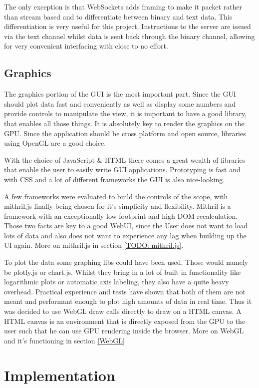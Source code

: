 The only exception is that WebSockets adds framing to make it packet rather than stream based and to differentiate between binary and text data.
This differentiation is very useful for this project. Instructions to the server are issued via the text channel whilst data is sent back through the binary channel, allowing for very convenient interfacing with close to no effort.

\subsection{Graphics}

The graphics portion of the GUI is the most important part. Since the GUI should plot data fast and conveniently as well as display some numbers and provide controls to manipulate the view, it is important to have a good library, that enables all those things. It is absolutely key to render the graphics on the GPU. Since the application should be cross platform and open source, libraries using OpenGL are a good choice.

With the choice of JavaScript \& HTML there comes a great wealth of libraries that enable the user to easily write GUI applications. Prototyping is fast and with CSS and a lot of different frameworks the GUI is also nice-looking.

A few frameworks were evaluated to build the controls of the scope, with mithril.js finally being chosen for it's simplicity and flexibility. Mithril is a framework with an exceptionally low footprint and high DOM recalculation.
Those two facts are key to a good WebUI, since the User does not want to load lots of data and also does not want to experience any lag when building up the UI again.
More on mithril.js in section \ref{TODO: mithril.js}.

To plot the data some graphing libs could have been used. Those would namely be plotly.js or chart.js. Whilst they bring in a lot of built in functionality like logarithmic plots or automatic axis labeling, they also have a quite heavy overhead.
Practical experience and tests have shown that both of them are not meant and performant enough to plot high amounts of data in real time.
Thus it was decided to use WebGL draw calls directly to draw on a HTML canvas. A HTML canvas is an environment that is directly exposed from the GPU to the user such that he can use GPU rendering inside the browser.
More on WebGL and it's functioning in section \ref{WebGL}

\section{Implementation}

